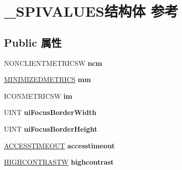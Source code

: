 \hypertarget{struct___s_p_i_v_a_l_u_e_s}{}\section{\+\_\+\+S\+P\+I\+V\+A\+L\+U\+E\+S结构体 参考}
\label{struct___s_p_i_v_a_l_u_e_s}
\subsection*{Public 属性}
\begin{DoxyCompactItemize}
\item 
\mbox{\label{struct___s_p_i_v_a_l_u_e_s_a134087a74048ff9b4846a5847ff4c246}} 
N\+O\+N\+C\+L\+I\+E\+N\+T\+M\+E\+T\+R\+I\+C\+SW {\bfseries ncm}
\item 
\mbox{\label{struct___s_p_i_v_a_l_u_e_s_a05c42fbfb25eb4911090ce5ba0b5b78f}} 
\hyperlink{structtag_m_i_n_i_m_i_z_e_d_m_e_t_r_i_c_s}{M\+I\+N\+I\+M\+I\+Z\+E\+D\+M\+E\+T\+R\+I\+CS} {\bfseries mm}
\item 
\mbox{\label{struct___s_p_i_v_a_l_u_e_s_a5ebb74b117096a7684334c8a8e79349f}} 
I\+C\+O\+N\+M\+E\+T\+R\+I\+C\+SW {\bfseries im}
\item 
\mbox{\label{struct___s_p_i_v_a_l_u_e_s_a10b0f876e648c13e3ba9cb45a9cb0d4a}} 
U\+I\+NT {\bfseries ui\+Focus\+Border\+Width}
\item 
\mbox{\label{struct___s_p_i_v_a_l_u_e_s_a0fb487a3c35436f4e80df503481733a5}} 
U\+I\+NT {\bfseries ui\+Focus\+Border\+Height}
\item 
\mbox{\label{struct___s_p_i_v_a_l_u_e_s_ab29803700c647109e2001fce548fedcc}} 
\hyperlink{structtag_a_c_c_e_s_s_t_i_m_e_o_u_t}{A\+C\+C\+E\+S\+S\+T\+I\+M\+E\+O\+UT} {\bfseries accesstimeout}
\item 
\mbox{\label{struct___s_p_i_v_a_l_u_e_s_a7836f374746eeca8e7f7044032fd963e}} 
\hyperlink{structtag_h_i_g_h_c_o_n_t_r_a_s_t_w}{H\+I\+G\+H\+C\+O\+N\+T\+R\+A\+S\+TW} {\bfseries highcontrast}
\item 
\mbox{\label{struct___s_p_i_v_a_l_u_e_s_a0cf3462616802287c4f11b0ff0ec91e7}} 

\end{DoxyCompactItemize}
